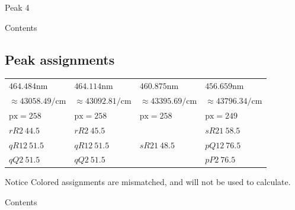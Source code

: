 \documentclass[aspectratio=43,scheme=plain]{ctexbeamer}
\begin{document}
\begin{frame}{Peak 4}
\begin{figure}[H]
\end{figure}
\end{frame}
\begin{frame}{Contents}
\end{frame}
\subsection{Peak assignments}
\begin{frame}{\insertsubsection}
			\begin{table}
			\centering  	 
			\scriptsize
			\begin{tabularx}{0.9\textwidth}{llll}       
				$464.484 \unit{\nano \meter}$ &$464.114\unit{\nano \meter}$&$460.875 \unit{\nano \meter}$& $456.659 \unit{\nano \meter}$\\
				$\approx43058.49 \unit{\per \centi \meter}$ &   $\approx43092.81\unit{\per \centi \meter}$ &  $\approx 43395.69\unit{\per \centi \meter}$ & $\approx 43796.34\unit{\per \centi \meter} $\\
				\toprule   
				$\text{px}=258$ & $\text{px}=258$ & $\text{px}=258$ &$ \text{px}=249$ \\  
				\midrule 
				$rR2\:44.5$ & $rR2\:45.5$ &  &$sR21\:58.5$\\  
				\textcolor[RGB]{0,112,127}{$qR12\:51.5$} & \textcolor[RGB]{0,112,127}{$qR12 \:51.5$} &  $sR21\:48.5$ & \textcolor[RGB]{0,112,127}{$pQ12 \:76.5$} \\ 
				\textcolor[RGB]{0,112,127}{$qQ2\: 51.5$} & \textcolor[RGB]{0,112,127}{$qQ2\: 51.5$} &   & \textcolor[RGB]{0,112,127}{$pP2\: 76.5$} \\ 
				\bottomrule    
			\end{tabularx}%
			\label{tab:addlabel}%
		\end{table}%
		\begin{alertblock}{Notice}
			\textcolor[RGB]{0,112,127}{Colored} assignments are mismatched, and will not be used to calculate.
		\end{alertblock}
	\end{frame}
	\begin{frame}{Contents}
	\end{frame}
\end{document}
